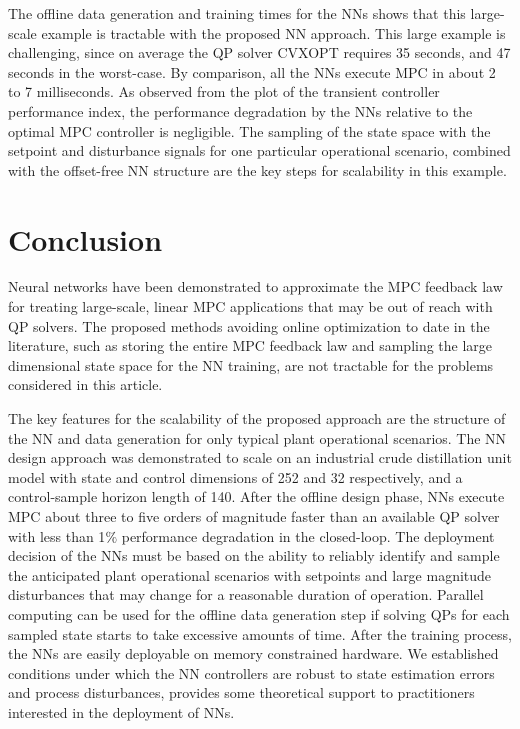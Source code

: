 \documentclass[preprint,5p, twocolumn, authoryear]{elsarticle}
\begin{document}
The offline data generation and training times for the NNs shows that this
large-scale example is tractable with the proposed NN approach. This large
example is challenging, since on average the QP solver CVXOPT requires 35
seconds, and 47 seconds in the worst-case. By comparison,  
all the NNs execute MPC in about 2 to 7 milliseconds. As observed from the plot
of the transient controller performance index, the performance degradation by
the NNs relative to the optimal MPC controller is negligible. The sampling of
the state space with the setpoint and disturbance signals for one particular
operational scenario, combined with the offset-free NN structure are the key
steps for scalability in this example. 

\section{Conclusion} \label{sec:conclusion}
Neural networks have been demonstrated to approximate the MPC feedback law for
treating large-scale, linear MPC applications that may be out of reach with QP
solvers. The proposed methods avoiding online optimization to date in the
literature, such as storing the entire MPC feedback law and sampling the large
dimensional state space for the NN training, are not tractable for the problems
considered in this article.

The key features for the scalability of the proposed approach are the structure
of the NN and data generation for only typical plant operational scenarios. The
NN design approach was demonstrated to scale on an industrial crude distillation
unit model with state and control dimensions of 252 and 32 respectively, and a
control-sample horizon length of 140. After the offline design phase, NNs
execute MPC about three to five orders of magnitude faster than an available QP
solver with less than 1$\%$ performance degradation in the closed-loop. The
deployment decision of the NNs must be based on the ability to reliably identify
and sample the anticipated plant operational scenarios with setpoints and large
magnitude disturbances that may change for a reasonable duration of operation.
Parallel computing can be used for the offline data generation step if solving
QPs for each sampled state starts to take excessive amounts of time. After the
training process, the NNs are easily deployable on memory constrained hardware.
We established conditions under which the NN controllers are robust to state
estimation errors and process disturbances, provides some theoretical support to
practitioners interested in the deployment of NNs. 
\end{document}
